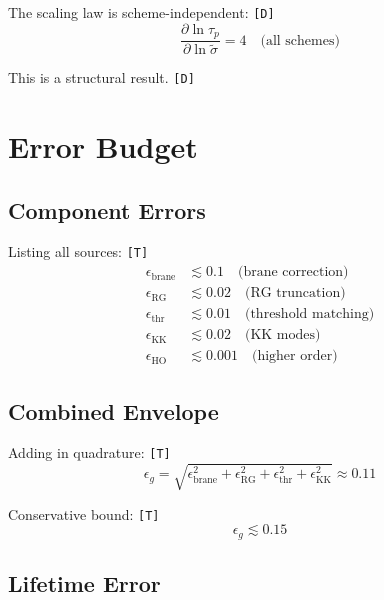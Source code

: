 \documentclass[11pt,a4paper]{article}
\newcommand{\tagD}{\textcolor{green!50!black}{\texttt{[D]}}}
\newcommand{\tagT}{\textcolor{cyan!70!black}{\texttt{[T]}}}
\theoremstyle{definition}
\begin{document}
The scaling law is scheme-independent: \tagD{}
\begin{equation}
\label{eq:struct-1}
\frac{\partial \ln\tau_p}{\partial \ln\tilde{\sigma}} = 4 \quad \text{(all schemes)}
\end{equation}

This is a structural result. \tagD{}

\section{Error Budget}
\label{app:error}

\subsection{Component Errors}
\label{app:comp-error}

Listing all sources: \tagT{}
\begin{align}
\label{eq:err-brane}
\epsilon_{\text{brane}} &\lesssim 0.1 \quad \text{(brane correction)} \\
\label{eq:err-rg}
\epsilon_{\text{RG}} &\lesssim 0.02 \quad \text{(RG truncation)} \\
\label{eq:err-thr}
\epsilon_{\text{thr}} &\lesssim 0.01 \quad \text{(threshold matching)} \\
\label{eq:err-kk}
\epsilon_{\text{KK}} &\lesssim 0.02 \quad \text{(KK modes)} \\
\label{eq:err-ho}
\epsilon_{\text{HO}} &\lesssim 0.001 \quad \text{(higher order)}
\end{align}

\subsection{Combined Envelope}
\label{app:combined-err}

Adding in quadrature: \tagT{}
\begin{equation}
\label{eq:err-combined}
\epsilon_g = \sqrt{\epsilon_{\text{brane}}^2 + \epsilon_{\text{RG}}^2 + \epsilon_{\text{thr}}^2 + \epsilon_{\text{KK}}^2} \approx 0.11
\end{equation}

Conservative bound: \tagT{}
\begin{equation}
\label{eq:err-bound}
\epsilon_g \lesssim 0.15
\end{equation}

\subsection{Lifetime Error}
\label{app:tau-error}
\end{document}
